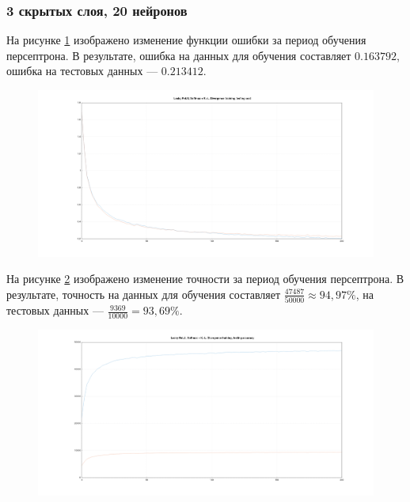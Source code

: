 \documentclass[a4paper, 14pt]{extarticle}
\begin{document}
\subsubsection{3 скрытых слоя, 20 нейронов}


На рисунке \ref{fig:3_20_leaky_relu_softmax_kl_divergence_cost} изображено изменение функции ошибки за период обучения персептрона.
В результате, ошибка на данных для обучения составляет $0.163792$, ошибка на тестовых данных --- $0.213412$.

\begin{figure}[!htb]
  \centering\includegraphics[width=\textwidth]{images/3_20_leaky_relu_softmax_kl_divergence_cost.png}
  \caption{}
  \label{fig:3_20_leaky_relu_softmax_kl_divergence_cost}
\end{figure}

На рисунке \ref{fig:3_20_leaky_relu_softmax_kl_divergence_accuracy} изображено изменение точности за период обучения персептрона.
В результате, точность на данных для обучения составляет $\frac{47487}{50000} \approx 94,97\%$, на тестовых данных --- $\frac{9369}{10000} = 93,69\%$.

\begin{figure}[!htb]
  \centering\includegraphics[width=\textwidth]{images/3_20_leaky_relu_softmax_kl_divergence_accuracy.png}
  \caption{}
  \label{fig:3_20_leaky_relu_softmax_kl_divergence_accuracy}
\end{figure}
\end{document}
